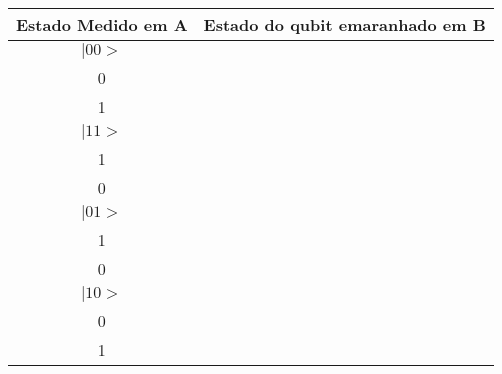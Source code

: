 \documentclass[12pt,oneside,brazil,hidelinks,a4paper]{abntex2}
\begin{document}
\begin{appendices}
\begin{longtable}[]{@{}cc@{}}
\toprule
\begin{minipage}[b]{0.37\columnwidth}\centering
Estado Medido em \textbf{A}\strut
\end{minipage} & \begin{minipage}[b]{0.57\columnwidth}\centering
Estado do qubit emaranhado em \textbf{B}\strut
\end{minipage}\tabularnewline
\midrule
\endhead
\begin{minipage}[t]{0.37\columnwidth}\centering
\(|00>\)\strut
\end{minipage} & \begin{minipage}[t]{0.57\columnwidth}\centering
\(\alpha \begin{bmatrix} 1 \\ 0 \end{bmatrix} + \beta \begin{bmatrix} 0 \\ 1 \end{bmatrix}\)\strut
\end{minipage}\tabularnewline
\begin{minipage}[t]{0.37\columnwidth}\centering
\(|11>\)\strut
\end{minipage} & \begin{minipage}[t]{0.57\columnwidth}\centering
\(\alpha \begin{bmatrix} 0 \\ 1 \end{bmatrix} - \beta \begin{bmatrix} 1 \\ 0 \end{bmatrix}\)\strut
\end{minipage}\tabularnewline
\begin{minipage}[t]{0.37\columnwidth}\centering
\(|01>\)\strut
\end{minipage} & \begin{minipage}[t]{0.57\columnwidth}\centering
\(\alpha \begin{bmatrix} 0 \\ 1 \end{bmatrix} + \beta \begin{bmatrix} 1 \\ 0 \end{bmatrix}\)\strut
\end{minipage}\tabularnewline
\begin{minipage}[t]{0.37\columnwidth}\centering
\(|10>\)\strut
\end{minipage} & \begin{minipage}[t]{0.57\columnwidth}\centering
\(\alpha \begin{bmatrix} 1 \\ 0 \end{bmatrix} - \beta \begin{bmatrix} 0 \\ 1 \end{bmatrix}\)\strut
\end{minipage}\tabularnewline
\bottomrule
\end{longtable}


\end{appendices}
\end{document}
